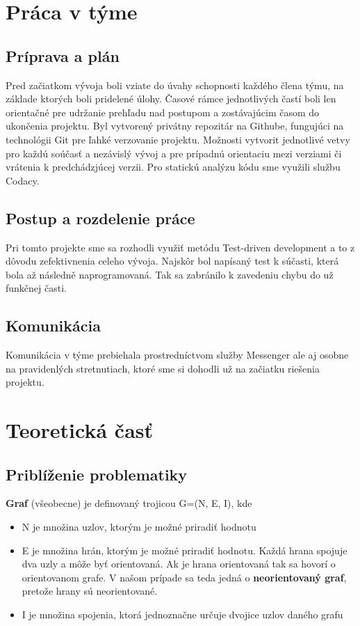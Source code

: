\documentclass[a4paper,11pt]{article}
\begin{document}
\section{Práca v týme}
\subsection{Príprava a plán}
Pred začiatkom vývoja boli vziate do úvahy schopnosti každého člena týmu, na základe ktorých boli pridelené úlohy. Časové rámce jednotlivých častí boli len orientačné pre udržanie prehľadu nad postupom a zostávajúcim časom do ukončenia projektu. Byl vytvorený privátny repozitár na Githube, fungujúci na technológii Git pre ľahké verzovanie projektu. Možnosti vytvorit jednotlivé vetvy pro každú soúčasť a nezávislý vývoj a pre prípadnú orientaciu mezi verziami či vrátenia k predchádzjúcej verzii. Pro statickú analýzu kódu sme využili službu Codacy.
\subsection{Postup a rozdelenie práce}
Pri tomto projekte sme sa rozhodli využiť metódu Test-driven development a to z dôvodu zefektivnenia celeho vývoja. Najskôr bol napísaný test k súčasti, která bola až následně naprogramovaná. Tak sa zabránilo k zavedeniu chybu do už funkčnej časti.
\subsection{Komunikácia}
Komunikácia v týme prebiehala prostredníctvom služby Messenger ale aj osobne na pravidenlých stretnutiach, ktoré sme si dohodli už na začiatku riešenia projektu.

\section{Teoretická časť}
\subsection{Priblíženie problematiky}
\textbf{Graf} (všeobecne) je definovaný trojicou G=(N, E, I), kde 
\begin{itemize}
    \item N je množina uzlov, ktorým je možné priradiť hodnotu
    \item E je množina hrán, ktorým je možné priradiť hodnotu. Každá hrana spojuje dva uzly a môže byť orientovaná. Ak je hrana orientovaná tak sa hovorí o orientovanom grafe. V našom prípade sa teda jedná o \textbf{neorientovaný graf}, pretože hrany sú neorientované.
    \item I je množina spojenia, ktorá jednoznačne určuje dvojice uzlov daného grafu
\end{itemize}
\end{document}
